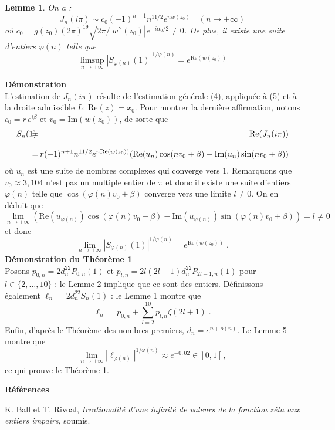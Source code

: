 \documentclass[12pt]{article}
\newcommand{\al}{\alpha}
\newcommand{\io}{+\infty}
\newtheorem{lem}{Lemme}
\begin{document}
\begin{lem}
On a :
$$
J_n(i\pi)\sim c_0(-1)^{n+1}n^{11/2}e^{nw(z_0)}\quad (n\to\io)
$$
o\`u 
$c_0=g(z_0)(2\pi)^{19}\sqrt{2\pi/|w^{\prime\prime}(z_0)|}e^{-i\al_0/2} 
\not=0$. De plus, il
existe une suite d'entiers $\varphi(n)$ telle que
$$
\limsup_{n\to\io}|S_{\varphi(n)}(1)|^{1/\varphi(n)}=e^{\text{Re}(w(z_0))}
$$

\end{lem}
\noindent \textbf{D\'emonstration}\\
L'estimation de $J_n(i\pi)$ r\'esulte de l'estimation g\'en\'erale (4),
appliqu\'ee \`a (5) et \`a la droite admissible 
\mbox{$L:\,\text{Re}(z)=x_0$.} Pour montrer la
derni\`ere affirmation, notons $c_0=r\,e^{i\beta}$ et 
$v_0=\text{Im}(w(z_0))$, de sorte que
\begin{eqnarray*}
S_n(1)\hskip -8pt&=&\hskip -8pt\text{Re}(J_n(i\pi))\\
\rule{0mm}{6mm}\hskip -8pt&=&\hskip -8pt 
r(-1)^{n+1}n^{11/2}e^{n\text{Re}(w(z_0))}
(\text{Re}(u_n)\cos(n v_0+\beta)-\text{Im}(u_n)\sin(n v_0+\beta))
\end{eqnarray*}
o\`u $u_n$ est une suite de nombres complexes qui converge vers $1$. 
Remarquons que $v_0\approx 3,104$ n'est
pas un multiple entier de $\pi$ et donc il existe une suite d'entiers 
$\varphi(n)$ telle que
$\cos(\varphi(n)v_0+\beta)$ converge vers une limite $l\neq0$. On en 
d\'eduit que
$$
\lim_{n\to\io}(\text{Re}(u_{\varphi(n)})\cos(\varphi(n)v_0+\beta)
-\text{Im}(u_{\varphi(n)})\sin(\varphi(n)v_0+\beta))=l\neq0
$$
et donc
$$
\lim_{n\to\io}|S_{\varphi(n)}(1)|^{1/\varphi(n)}=e^{\text{Re}(w(z_0))}\;.
$$
\vskip 0.5cm
\noindent \textbf{D\'emonstration du Th\'eor\`eme 1}\\
Posons $p_{0,n}=2d_{n}^{22}P_{0,n}(1)$ et 
$p_{l,n}=2l(2l-1)d_{n}^{22}P_{2l-1,n}(1)$
pour $l\in\{2,\dots,10\}$ : le Lemme 2 implique que ce sont des entiers.
D\'efinissons \'egalement $\ell_n=2d_{n}^{22}S_{n}(1)$ : le Lemme 1 montre que
$$
\ell_n=p_{0,n}+\sum_{l=2}^{10} p_{l,n}\zeta(2l+1)\;.
$$
Enfin, d'apr\`es le Th\'eor\`eme des nombres premiers, $d_n=e^{n+o(n)}$.
Le Lemme 5 montre que
$$
\lim_{n\to\io}|\ell_{\varphi(n)}|^{1/{\varphi(n)}}\approx 
e^{-0,02}\in\,]\,0,1\,[\;,
$$
ce qui prouve le Th\'eor\`eme 1.\\ \null


\vspace{0.2cm}
\centerline{\textbf{R\'ef\'erences}}
\vspace{0.2cm}

\noindent [BR] K. Ball et T. Rivoal, \textit{Irrationalit\'e d'une infinit\'e
de valeurs de la fonction z\^eta aux entiers impairs}, soumis.\\ \null
\end{document}
